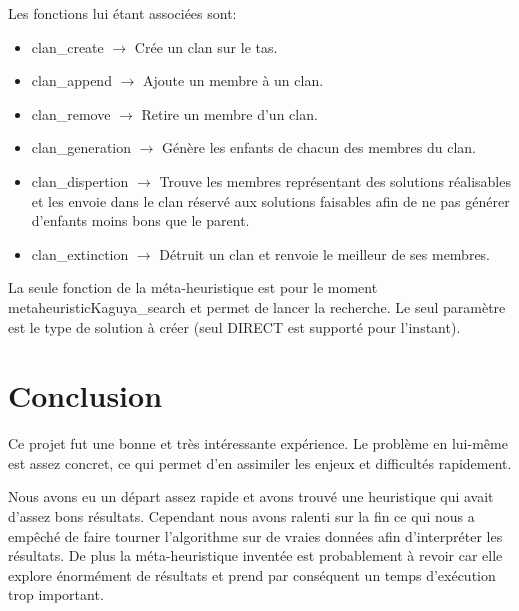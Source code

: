 \documentclass{EPUProjetPeiP}
\begin{document}
Les fonctions lui étant associées sont:\begin{itemize}
	\item clan\_create $\longrightarrow$ Crée un clan sur le tas.
	\item clan\_append $\longrightarrow$ Ajoute un membre à un clan.
	\item clan\_remove $\longrightarrow$ Retire un membre d'un clan.
	\item clan\_generation $\longrightarrow$ Génère les enfants de chacun des membres du clan.
	\item clan\_dispertion $\longrightarrow$ Trouve les membres représentant des solutions réalisables et les envoie dans le clan réservé aux solutions faisables afin de ne pas générer d'enfants moins bons que le parent.
	\item clan\_extinction $\longrightarrow$ Détruit un clan et renvoie le meilleur de ses membres.
	\\
\end{itemize}

La seule fonction de la méta-heuristique est pour le moment metaheuristicKaguya\_search et permet de lancer la recherche. Le seul paramètre est le type de solution à créer (seul DIRECT est supporté pour l'instant).

\chapter*{Conclusion}

\label{sec:conclusion}

Ce projet fut une bonne et très intéressante expérience. Le problème en lui-même est assez concret, ce qui permet d'en assimiler les enjeux et difficultés rapidement.

Nous avons eu un départ assez rapide et avons trouvé une heuristique qui avait d'assez bons résultats. Cependant nous avons ralenti sur la fin ce qui nous a empêché de faire tourner l'algorithme sur de vraies données afin d'interpréter les résultats. De plus la méta-heuristique inventée est probablement à revoir car elle explore énormément de résultats et prend par conséquent un temps d'exécution trop important.


\appendix
{}
\end{document}
